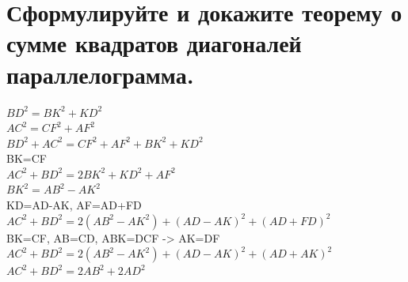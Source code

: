 \documentclass[12pt, letterpaper]{article}
\begin{document}
\section {Сформулируйте и докажите теорему о сумме квадратов диагоналей параллелограмма.}
$BD^2=BK^2+KD^2 $ \\
$AC^2=CF^2+AF^2$ \\
$BD^2+AC^2=CF^2+AF^2+BK^2+KD^2$ \\
BK=CF\\
$AC^2+BD^2=2BK^2+KD^2+AF^2$\\
$BK^2=AB^2-AK^2$\\
KD=AD-AK, AF=AD+FD \\
$AC^2+BD^2=2(AB^2-AK^2)+(AD-AK)^2+(AD+FD)^2$\\
BK=CF, AB=CD, ABK=DCF -> AK=DF\\
$AC^2+BD^2=2(AB^2-AK^2)+(AD-AK)^2+(AD+AK)^2$\\
$AC^2+BD^2=2AB^2+2AD^2$\\
\end{document}

